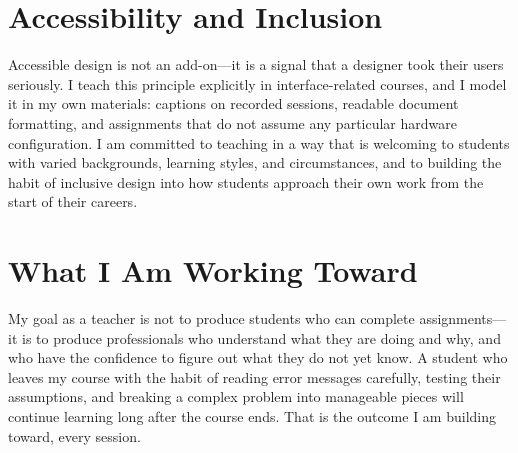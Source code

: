 \documentclass[11pt]{article}
\begin{document}
\section*{Accessibility and Inclusion}

Accessible design is not an add-on---it is a signal that a designer took their users seriously. I teach this principle explicitly in interface-related courses, and I model it in my own materials: captions on recorded sessions, readable document formatting, and assignments that do not assume any particular hardware configuration. I am committed to teaching in a way that is welcoming to students with varied backgrounds, learning styles, and circumstances, and to building the habit of inclusive design into how students approach their own work from the start of their careers.

\section*{What I Am Working Toward}

My goal as a teacher is not to produce students who can complete assignments---it is to produce professionals who understand what they are doing and why, and who have the confidence to figure out what they do not yet know. A student who leaves my course with the habit of reading error messages carefully, testing their assumptions, and breaking a complex problem into manageable pieces will continue learning long after the course ends. That is the outcome I am building toward, every session.
\end{document}
